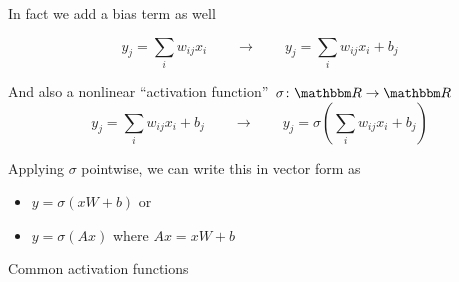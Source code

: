 \begin{frame}
    
    In fact we add a bias term as well

    \begin{equation*}
        y_j = \sum_i w_{ij} x_i       
        \qquad \to \qquad
        y_j = \sum_i w_{ij} x_i + b_j
    \end{equation*}

    And also a nonlinear ``activation function'' $\sigma \colon \RR \to \RR$
    \begin{equation*}
        y_j = \sum_i w_{ij} x_i + b_j
        \qquad \to \qquad
        y_j = \sigma \left(\sum_i w_{ij} x_i + b_j \right)
    \end{equation*}

    Applying $\sigma$ pointwise, we can write this in vector form as
    \begin{itemize}
        \item $y = \sigma(x W + b)$ or
        \item $y = \sigma(Ax)$  where $Ax = xW + b$
    \end{itemize}

    
\end{frame}

\begin{frame}{Common activation functions}
    
    \begin{figure}
       \centering
    \end{figure}


\end{frame}

